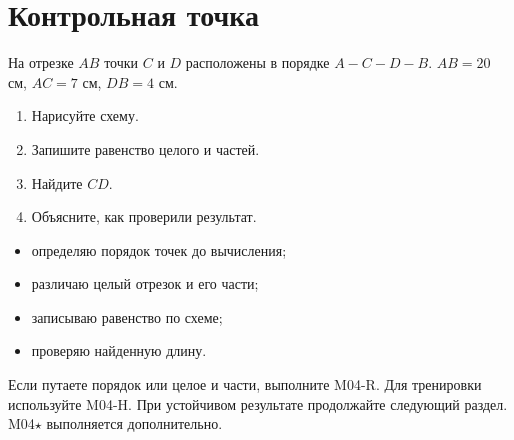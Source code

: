 \section{Контрольная точка}

\begin{checkpointbox}
  На отрезке $AB$ точки $C$ и $D$ расположены в порядке $A-C-D-B$.
  $AB=20$ см, $AC=7$ см, $DB=4$ см.
  \begin{enumerate}[label=\textbf{\arabic*.}]
    \item Нарисуйте схему. 
    \item Запишите равенство целого и частей. \answerblank[95mm]
    \item Найдите $CD$. 
    \item Объясните, как проверили результат. 
  \end{enumerate}
\end{checkpointbox}

\begin{reflectionbox}
  \begin{itemize}[label=\choicebox]
    \item определяю порядок точек до вычисления;
    \item различаю целый отрезок и его части;
    \item записываю равенство по схеме;
    \item проверяю найденную длину.
  \end{itemize}
\end{reflectionbox}

\begin{resultbox}
  Если путаете порядок или целое и части, выполните M04-R. Для тренировки
  используйте M04-H. При устойчивом результате продолжайте следующий раздел.
  M04\(\star\) выполняется дополнительно.
\end{resultbox}
